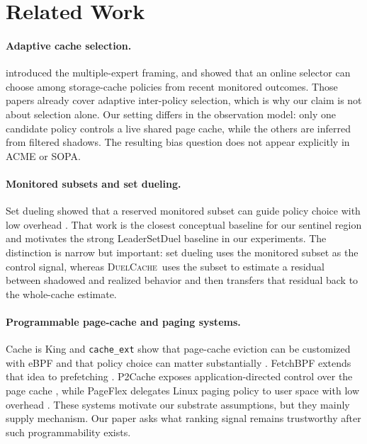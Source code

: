 \documentclass{article}
\newcommand{\duel}{\textsc{DuelCache}}
\begin{document}
\section{Related Work}
\label{sec:related}

\paragraph{Adaptive cache selection.}
\citet{ari2002acme} introduced the multiple-expert framing, and \citet{wang2010sopa} showed that an online selector can choose among storage-cache policies from recent monitored outcomes. Those papers already cover adaptive inter-policy selection, which is why our claim is not about selection alone. Our setting differs in the observation model: only one candidate policy controls a live shared page cache, while the others are inferred from filtered shadows. The resulting bias question does not appear explicitly in ACME or SOPA.

\paragraph{Monitored subsets and set dueling.}
Set dueling showed that a reserved monitored subset can guide policy choice with low overhead \citep{qureshi2008set}. That work is the closest conceptual baseline for our sentinel region and motivates the strong LeaderSetDuel baseline in our experiments. The distinction is narrow but important: set dueling uses the monitored subset as the control signal, whereas \duel\ uses the subset to estimate a residual between shadowed and realized behavior and then transfers that residual back to the whole-cache estimate.

\paragraph{Programmable page-cache and paging systems.}
Cache is King and \texttt{cache\_ext} show that page-cache eviction can be customized with eBPF and that policy choice can matter substantially \citep{zussman2025cache,zussman2025cacheext}. FetchBPF extends that idea to prefetching \citep{cao2024fetchbpf}. P2Cache exposes application-directed control over the page cache \citep{lee2023p2cache}, while PageFlex delegates Linux paging policy to user space with low overhead \citep{yelam2025pageflex}. These systems motivate our substrate assumptions, but they mainly supply mechanism. Our paper asks what ranking signal remains trustworthy after such programmability exists.
\end{document}
